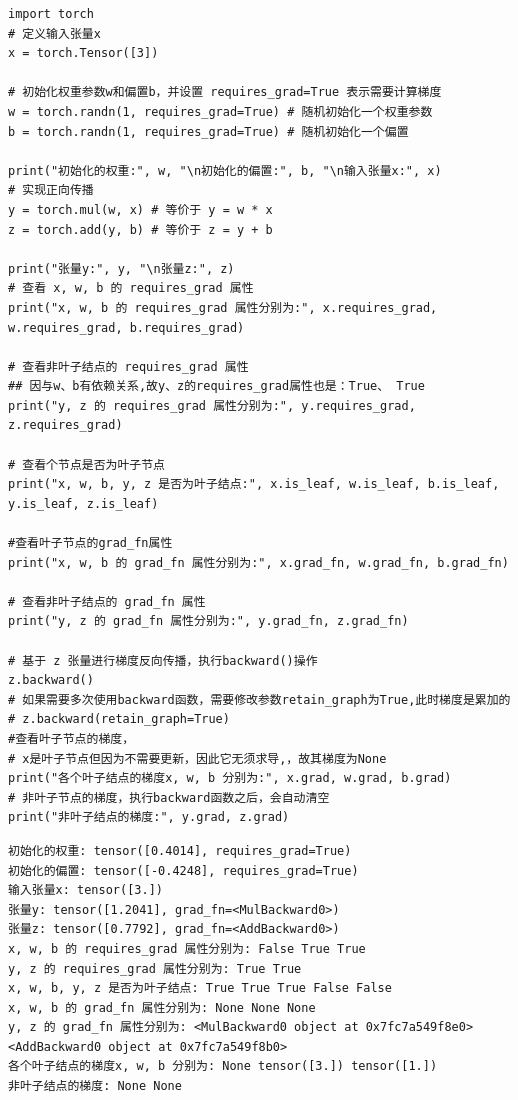 \label{subsubsec:Pytorch的标量反向传播}
\begin{lstlisting}[style=pythonstyle]
import torch
# 定义输入张量x 
x = torch.Tensor([3])

# 初始化权重参数w和偏置b，并设置 requires_grad=True 表示需要计算梯度
w = torch.randn(1, requires_grad=True) # 随机初始化一个权重参数
b = torch.randn(1, requires_grad=True) # 随机初始化一个偏置

print("初始化的权重:", w, "\n初始化的偏置:", b, "\n输入张量x:", x)
# 实现正向传播
y = torch.mul(w, x) # 等价于 y = w * x
z = torch.add(y, b) # 等价于 z = y + b

print("张量y:", y, "\n张量z:", z)
# 查看 x, w, b 的 requires_grad 属性
print("x, w, b 的 requires_grad 属性分别为:", x.requires_grad, w.requires_grad, b.requires_grad)

# 查看非叶子结点的 requires_grad 属性
## 因与w、b有依赖关系,故y、z的requires_grad属性也是：True、 True
print("y, z 的 requires_grad 属性分别为:", y.requires_grad, z.requires_grad)

# 查看个节点是否为叶子节点
print("x, w, b, y, z 是否为叶子结点:", x.is_leaf, w.is_leaf, b.is_leaf, y.is_leaf, z.is_leaf)

#查看叶子节点的grad_fn属性
print("x, w, b 的 grad_fn 属性分别为:", x.grad_fn, w.grad_fn, b.grad_fn)

# 查看非叶子结点的 grad_fn 属性
print("y, z 的 grad_fn 属性分别为:", y.grad_fn, z.grad_fn)

# 基于 z 张量进行梯度反向传播，执行backward()操作
z.backward()
# 如果需要多次使用backward函数，需要修改参数retain_graph为True,此时梯度是累加的
# z.backward(retain_graph=True)
#查看叶子节点的梯度，
# x是叶子节点但因为不需要更新，因此它无须求导,，故其梯度为None
print("各个叶子结点的梯度x, w, b 分别为:", x.grad, w.grad, b.grad)
# 非叶子节点的梯度，执行backward函数之后，会自动清空
print("非叶子结点的梯度:", y.grad, z.grad)
\end{lstlisting}
\begin{lstlisting}[style=demostyle,numbers=none]
初始化的权重: tensor([0.4014], requires_grad=True) 
初始化的偏置: tensor([-0.4248], requires_grad=True) 
输入张量x: tensor([3.])
张量y: tensor([1.2041], grad_fn=<MulBackward0>) 
张量z: tensor([0.7792], grad_fn=<AddBackward0>)
x, w, b 的 requires_grad 属性分别为: False True True
y, z 的 requires_grad 属性分别为: True True
x, w, b, y, z 是否为叶子结点: True True True False False
x, w, b 的 grad_fn 属性分别为: None None None
y, z 的 grad_fn 属性分别为: <MulBackward0 object at 0x7fc7a549f8e0> <AddBackward0 object at 0x7fc7a549f8b0>
各个叶子结点的梯度x, w, b 分别为: None tensor([3.]) tensor([1.])
非叶子结点的梯度: None None
\end{lstlisting}

